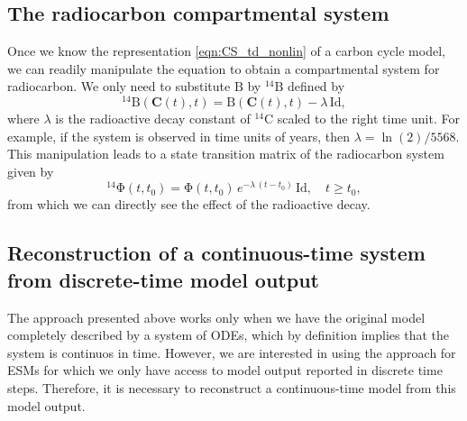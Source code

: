 \documentclass[11pt,a4paper]{article}
\renewcommand{\vec}[1]{\mathbf{#1}}
\newcommand{\tens}[1]{\mathrm{#1}}
\newcommand{\id}{\tens{Id}}
\begin{document}
\subsection{The radiocarbon compartmental system}
    Once we know the representation \eqref{eqn:CS_td_nonlin} of a carbon cycle model, we can readily manipulate the equation to obtain a compartmental system for radiocarbon.
    We only need to substitute $\tens{B}$ by ${}^{14}\tens{B}$ defined by
    \begin{equation*}
        {}^{14}\tens{B}(\vec{C}(t),t) = \tens{B}(\vec{C}(t),t) - \lambda\,\id,
    \end{equation*}
    where $\lambda$ is the radioactive decay constant of ${}^{14}$C scaled to the right time unit.
    For example, if the system is observed in time units of years, then $\lambda=\ln(2)/5568$.
    This manipulation leads to a state transition matrix of the radiocarbon system given by
    \begin{equation*}
        {}^{14}\tens{\Phi}(t,t_0) = \tens{\Phi}(t,t_0)\, e^{-\lambda\,(t-t_0)}\,\id, \quad t\geq t_0,
    \end{equation*}
    from which we can directly see the effect of the radioactive decay.


\subsection{Reconstruction of a continuous-time system from discrete-time model output}
The approach presented above works only when we have the original model completely described by a system of ODEs, which by definition implies that the system is continuos in time. However, we are interested in using the approach for ESMs for which we only have access to model output reported in discrete time steps. Therefore, it is necessary to reconstruct a continuous-time model from this model output. 
    
\end{document}
